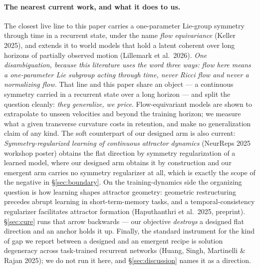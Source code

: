 \documentclass{article}
\begin{document}
\paragraph{The nearest current work, and what it does to us.} The closest live line to this paper carries a one-parameter Lie-group
symmetry through time in a recurrent state, under the name \emph{flow equivariance} (Keller 2025), and extends it to world models that
hold a latent coherent over long horizons of partially observed motion (Lillemark et al.\ 2026). \emph{One disambiguation, because this
literature uses the word three ways: \emph{flow} here means a one-parameter Lie subgroup acting through time, never Ricci flow and never
a normalizing flow.} That line and this paper share an object --- a continuous symmetry carried in a recurrent state over a long horizon
--- and split the question cleanly: \emph{they generalize, we price}. Flow-equivariant models are shown to extrapolate to unseen
velocities and beyond the training horizon; we measure what a given transverse curvature costs in retention, and make no generalization
claim of any kind. The soft counterpart of our designed arm is also current: \emph{Symmetry-regularized learning of continuous
attractor dynamics} (NeurReps 2025 workshop poster) obtains the flat direction by symmetry regularization of a learned model, where our designed arm obtains it by construction and our emergent arm carries no symmetry regularizer at all,
which is exactly the scope of the negative in \S\ref{sec:boundary}. On the training-dynamics side the organizing question is how learning
shapes attractor geometry: geometric restructuring precedes abrupt learning in short-term-memory tasks, and a temporal-consistency
regularizer facilitates attractor formation (Haputhanthri et al.\ 2025, preprint). \S\ref{sec:cure} runs that arrow backwards --- our
objective \emph{destroys} a designed flat direction and an anchor holds it up. Finally, the standard instrument for the kind of gap we
report between a designed and an emergent recipe is solution degeneracy across task-trained recurrent networks
(Huang, Singh, Martinelli \& Rajan 2025); we do not run it here, and \S\ref{sec:discussion} names it as a direction.
\end{document}
